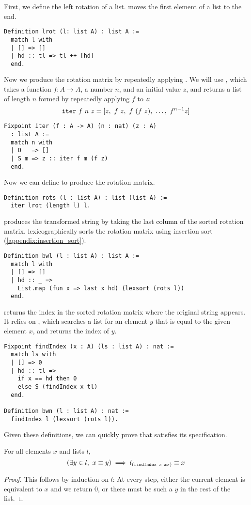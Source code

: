 \documentclass[sigplan,10pt,anonymous,review]{thesis}
\begin{document}
First, we define the left rotation of a list.  moves the
first element of a list to the end.
\begin{lstlisting}
Definition lrot (l: list A) : list A :=
  match l with
  | [] => []
  | hd :: tl => tl ++ [hd]
  end.
\end{lstlisting}
Now we produce the rotation matrix by repeatedly applying .
We will use , which takes a function $f : A \to A$, a number
$n$, and an initial value $z$, and returns a list of length $n$ formed
by repeatedly applying $f$ to $z$:
\begin{equation*}
  \texttt{\textup{iter}}~f~n~z = [z,~f~z,~f~(f~z),~\ldots,~f^{n-1} z]
  \label{eq:iter}
\end{equation*}
\begin{lstlisting}
Fixpoint iter (f : A -> A) (n : nat) (z : A)
  : list A :=
  match n with
  | O   => []
  | S m => z :: iter f m (f z)
  end.
\end{lstlisting}
Now we can define  to produce the rotation matrix.
\begin{lstlisting}
Definition rots (l : list A) : list (list A) :=
  iter lrot (length l) l.
\end{lstlisting}

 produces the transformed string by taking the last column of
the sorted rotation matrix.  lexicographically sorts the
rotation matrix using insertion sort (\cref{appendix:insertion_sort}).
\begin{lstlisting}
Definition bwl (l : list A) : list A :=
  match l with
  | [] => []
  | hd :: _ =>
    List.map (fun x => last x hd) (lexsort (rots l))
  end.
\end{lstlisting}

 returns the index in the sorted rotation matrix where the
original string appears. It relies on , which searches
a list for an element $y$ that is equal to the given element $x$, and
returns the index of $y$.
\begin{lstlisting}
Fixpoint findIndex (x : A) (ls : list A) : nat :=
  match ls with
  | [] => 0
  | hd :: tl =>
    if x == hd then 0
    else S (findIndex x tl)
  end.

Definition bwn (l : list A) : nat :=
  findIndex l (lexsort (rots l)).
\end{lstlisting}

Given these definitions, we can quickly prove that  satisfies
its specification.

\begin{lemma}
  For all elements $x$ and lists $l$,
  \begin{equation*}
    (\exists y \in l,~x \equiv y) \implies l_{(\texttt{\textup{findIndex}}~x~xs)} \equiv x
  \end{equation*}
\end{lemma}
\begin{proof}
  This follows by induction on $l$: At every step, either the
  current element is equivalent to $x$ and we return $0$, or there
  must be such a $y$ in the rest of the list.
\end{proof}
\end{document}
